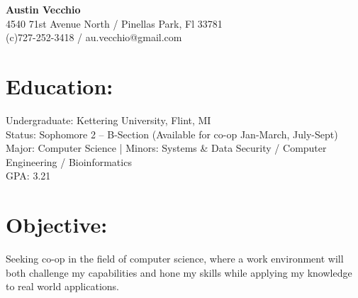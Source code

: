\documentclass{res}
\begin{document}
\begin{center}
\LARGE{\textbf{Austin Vecchio}}\\
\normalsize{
4540 71st Avenue North / Pinellas Park, Fl 33781\\
(c)727-252-3418 / au.vecchio@gmail.com
}
\end{center}

\section{Education:}

Undergraduate: Kettering University, Flint, MI\\
Status: Sophomore 2 – B-Section (Available for co-op Jan-March, July-Sept)\\
Major: Computer Science %
|   Minors: Systems \& Data Security / Computer Engineering / Bioinformatics\\
GPA: 3.21

\section{Objective:}
Seeking co-op in the field of computer science, where a work environment will both challenge my capabilities and hone my skills while applying my knowledge to real world applications.\\
\end{document}
